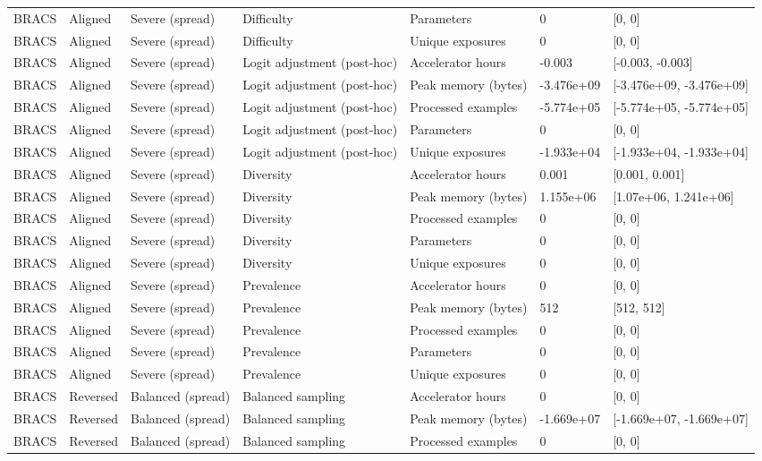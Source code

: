 \begin{longtable}{lllllll}
BRACS & Aligned & Severe (spread) & Difficulty & Parameters & 0 & [0, 0] \\
BRACS & Aligned & Severe (spread) & Difficulty & Unique exposures & 0 & [0, 0] \\
BRACS & Aligned & Severe (spread) & Logit adjustment (post-hoc) & Accelerator hours & -0.003 & [-0.003, -0.003] \\
BRACS & Aligned & Severe (spread) & Logit adjustment (post-hoc) & Peak memory (bytes) & -3.476e+09 & [-3.476e+09, -3.476e+09] \\
BRACS & Aligned & Severe (spread) & Logit adjustment (post-hoc) & Processed examples & -5.774e+05 & [-5.774e+05, -5.774e+05] \\
BRACS & Aligned & Severe (spread) & Logit adjustment (post-hoc) & Parameters & 0 & [0, 0] \\
BRACS & Aligned & Severe (spread) & Logit adjustment (post-hoc) & Unique exposures & -1.933e+04 & [-1.933e+04, -1.933e+04] \\
BRACS & Aligned & Severe (spread) & Diversity & Accelerator hours & 0.001 & [0.001, 0.001] \\
BRACS & Aligned & Severe (spread) & Diversity & Peak memory (bytes) & 1.155e+06 & [1.07e+06, 1.241e+06] \\
BRACS & Aligned & Severe (spread) & Diversity & Processed examples & 0 & [0, 0] \\
BRACS & Aligned & Severe (spread) & Diversity & Parameters & 0 & [0, 0] \\
BRACS & Aligned & Severe (spread) & Diversity & Unique exposures & 0 & [0, 0] \\
BRACS & Aligned & Severe (spread) & Prevalence & Accelerator hours & 0 & [0, 0] \\
BRACS & Aligned & Severe (spread) & Prevalence & Peak memory (bytes) & 512 & [512, 512] \\
BRACS & Aligned & Severe (spread) & Prevalence & Processed examples & 0 & [0, 0] \\
BRACS & Aligned & Severe (spread) & Prevalence & Parameters & 0 & [0, 0] \\
BRACS & Aligned & Severe (spread) & Prevalence & Unique exposures & 0 & [0, 0] \\
BRACS & Reversed & Balanced (spread) & Balanced sampling & Accelerator hours & 0 & [0, 0] \\
BRACS & Reversed & Balanced (spread) & Balanced sampling & Peak memory (bytes) & -1.669e+07 & [-1.669e+07, -1.669e+07] \\
BRACS & Reversed & Balanced (spread) & Balanced sampling & Processed examples & 0 & [0, 0] \\

\end{longtable}
